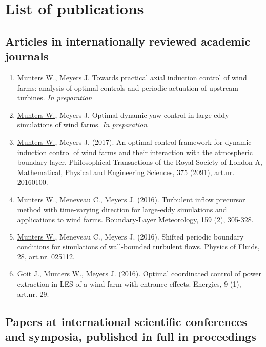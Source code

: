 \chapter{List of publications}\label{ch:methodology}

\section*{Articles in internationally reviewed academic journals}

\begin{enumerate}
	
\item \underline{Munters W.}, Meyers J. Towards practical axial induction control of wind farms: analysis of optimal controls and periodic actuation of upstream turbines. \emph{In preparation}	
	
\item \underline{Munters W.}, Meyers J. Optimal dynamic yaw control in large-eddy simulations of wind farms. \emph{In preparation}

\item \underline{Munters W.}, Meyers J. (2017). An optimal control framework for dynamic induction control of wind farms and their interaction with the atmospheric boundary layer. Philosophical Transactions of the Royal Society of London A, Mathematical, Physical and Engineering Sciences, 375 (2091), art.nr. 20160100.

\item \underline{Munters W.}, Meneveau C., Meyers J. (2016). Turbulent inflow precursor method with time-varying direction for large-eddy simulations and applications to wind farms. Boundary-Layer Meteorology, 159 (2), 305-328.

\item \underline{Munters W.}, Meneveau C., Meyers J. (2016). Shifted periodic boundary conditions for simulations of wall-bounded turbulent flows. Physics of Fluids, 28, art.nr. 025112.

\item Goit J., \underline{Munters W.}, Meyers J. (2016). Optimal coordinated control of power extraction in LES of a wind farm with entrance effects. Energies, 9 (1), art.nr. 29.
\end{enumerate}


\section*{Papers at international scientific conferences and symposia, published in full in proceedings}

